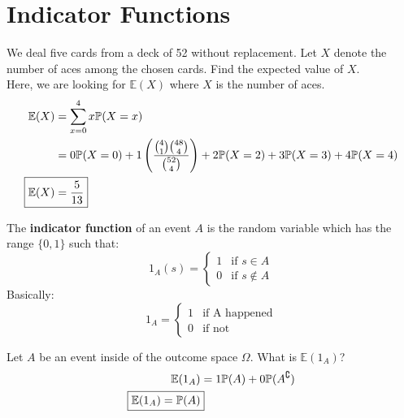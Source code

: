 \documentclass[titlepage, 12pt, leqno]{article}
\begin{document}
\pagebreak
\section{Indicator Functions}

\begin{ex}
    We deal five cards from a deck of 52 without replacement. Let $X$ denote the
    number of aces among the chosen cards. Find the expected value of $X$.
    \\[.1in]
    Here, we are looking for $ \mathbb{E}(X)$ where $X$ is the number of aces.
   \begin{align*}
       \mathbb{E}(X) &= \sum_{x=0}^{4}x \mathbb{P}(X=x) \\
                     &= 0\mathbb{P}(X=0)+1\left(\frac{\binom{4}{1}
                         \binom{48}{4}}{\binom{52}{4}}\right) +
                         2\mathbb{P}(X=2) + 3\mathbb{P}(X=3) + 
                         4\mathbb{P}(X=4)\\
       \Aboxed{ \mathbb{E}(X) &= \frac{5}{13}} 
   \end{align*}
\end{ex}

\begin{definition}
    The \textbf{indicator function} of an event $A$ is the random variable which
    has the range $\{0,1\}$ such that:
    \[
        1_A(s) =
    \begin{cases}
        1 & \text{if } s \in A \\
        0 & \text{if }s \notin A
    \end{cases}
    \]
    Basically:
    \[
        1_A =
    \begin{cases}
        1 & \text{if A happened} \\
        0 & \text{if not}
    \end{cases}
    \]
\end{definition}

\begin{ex}
    Let $A$ be an event inside of the outcome space $\Omega $. What is
    $ \mathbb{E}(1_A)$?
   \begin{align*}
       \mathbb{E}(1_A) &= 1\mathbb{P}(A) + 0\mathbb{P}(A^\complement)\\
        \Aboxed{ \mathbb{E}(1_A) = \mathbb{P}(A)} 
   \end{align*}
\end{ex}
\end{document}
